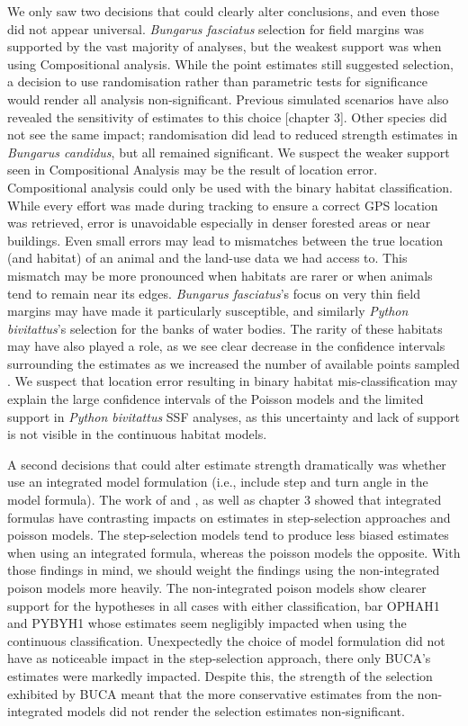 \documentclass[10pt,a4paper]{article}
\begin{document}
We only saw two decisions that could clearly alter conclusions, and even those did not appear universal.
\emph{Bungarus fasciatus} selection for field margins was supported by the vast majority of analyses, but the weakest support was when using Compositional analysis.
While the point estimates still suggested selection, a decision to use randomisation rather than parametric tests for significance would render all analysis non-significant.
Previous simulated scenarios have also revealed the sensitivity of estimates to this choice {[}chapter 3{]}.
Other species did not see the same impact; randomisation did lead to reduced strength estimates in \emph{Bungarus candidus}, but all remained significant.
We suspect the weaker support seen in Compositional Analysis may be the result of location error.
Compositional analysis could only be used with the binary habitat classification.
While every effort was made during tracking to ensure a correct GPS location was retrieved, error is unavoidable especially in denser forested areas or near buildings.
Even small errors may lead to mismatches between the true location (and habitat) of an animal and the land-use data we had access to.
This mismatch may be more pronounced when habitats are rarer or when animals tend to remain near its edges.
\emph{Bungarus fasciatus}'s focus on very thin field margins may have made it particularly susceptible, and similarly \emph{Python bivitattus}'s selection for the banks of water bodies.
The rarity of these habitats may have also played a role, as we see clear decrease in the confidence intervals surrounding the estimates as we increased the number of available points sampled .
We suspect that location error resulting in binary habitat mis-classification may explain the large confidence intervals of the Poisson models and the limited support in \emph{Python bivitattus} SSF analyses, as this uncertainty and lack of support is not visible in the continuous habitat models.

A second decisions that could alter estimate strength dramatically was whether use an integrated model formulation (i.e., include step and turn angle in the model formula).
The work of and , as well as chapter 3 showed that integrated formulas have contrasting impacts on estimates in step-selection approaches and poisson models.
The step-selection models tend to produce less biased estimates when using an integrated formula, whereas the poisson models the opposite.
With those findings in mind, we should weight the findings using the non-integrated poison models more heavily.
The non-integrated poison models show clearer support for the hypotheses in all cases with either classification, bar OPHAH1 and PYBYH1 whose estimates seem negligibly impacted when using the continuous classification.
Unexpectedly the choice of model formulation did not have as noticeable impact in the step-selection approach, there only BUCA's estimates were markedly impacted.
Despite this, the strength of the selection exhibited by BUCA meant that the more conservative estimates from the non-integrated models did not render the selection estimates non-significant.
\end{document}
